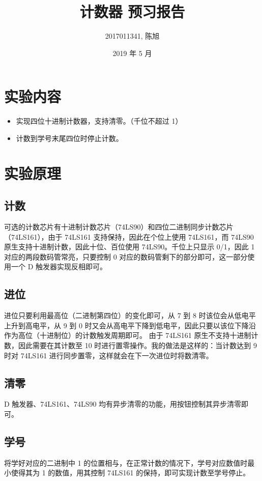 \documentclass[a4paper]{article}
\title{计数器 预习报告}
\author{2017011341, 陈旭}
\date{2019 年 5 月}
\begin{document}
\maketitle

\section{实验内容}

    \begin{itemize}
        \item 实现四位十进制计数器，支持清零。（千位不超过 1）
        \item 计数到学号末尾四位时停止计数。
    \end{itemize}

\section{实验原理}

    \subsection{计数}
        可选的计数芯片有十进制计数芯片（74LS90）和四位二进制同步计数芯片（74LS161），由于 74LS161 支持保持，因此在个位上使用 74LS161，而 74LS90 原生支持十进制计数，因此十位、百位使用 74LS90。千位上只显示 0/1，因此 1 对应的两段数码管常亮，只要控制 0 对应的数码管剩下的部分即可，这一部分使用一个 D 触发器实现反相即可。

    \subsection{进位}
        进位只要利用最高位（二进制第四位）的变化即可，从 7 到 8 时该位会从低电平上升到高电平，从 9 到 0 时又会从高电平下降到低电平，因此只要以该位下降沿作为高位（十进制位）的计数触发周期即可。
        由于 74LS161 原生不支持十进制计数，因此需要在其计数至 10 时进行置零操作。我的做法是这样的：当计数达到 9 时对 74LS161 进行同步置零，这样就会在下一次进位时将数清零。

    \subsection{清零}
        D 触发器、74LS161、74LS90 均有异步清零的功能，用按钮控制其异步清零即可。

    \subsection{学号}
        将学好对应的二进制中 1 的位置相与，在正常计数的情况下，学号对应数值时最小使得其为 1 的数值，用其控制 74LS161 的保持，即可实现计数至学号停止。
\end{document}
